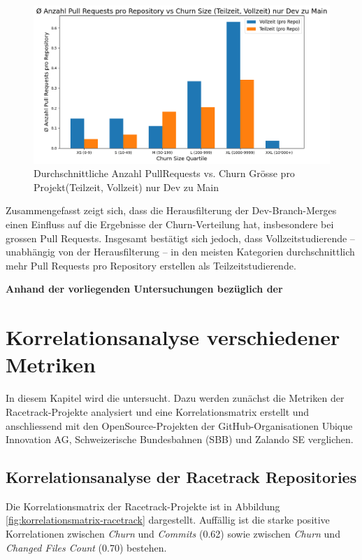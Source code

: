 \begin{figure}[htbp]
    \includegraphics[width=\textwidth]{Figures/avg-anz-prs-vs-churn-size-tz-vz-pro-repo-nur-dev.png}
    \caption{Durchschnittliche Anzahl PullRequests vs. Churn Grösse pro Projekt(Teilzeit, Vollzeit) nur Dev zu Main}
    \label{fig:anz-prs-vs-churn-size-tz-vz-nur-dev}
\end{figure}

Zusammengefasst zeigt sich, dass die Herausfilterung der Dev-Branch-Merges einen Einfluss auf die Ergebnisse der Churn-Verteilung hat, insbesondere bei grossen Pull Requests. Insgesamt bestätigt sich jedoch, dass Vollzeitstudierende – unabhängig von der Herausfilterung – in den meisten Kategorien durchschnittlich mehr Pull Requests pro Repository erstellen als Teilzeitstudierende.

\textbf{Anhand der vorliegenden Untersuchungen bezüglich der  }

\section{Korrelationsanalyse verschiedener Metriken}
In diesem Kapitel wird die  untersucht. Dazu werden zunächst die Metriken der Racetrack-Projekte analysiert und eine Korrelationsmatrix erstellt und anschliessend mit den OpenSource-Projekten der GitHub-Organisationen Ubique Innovation AG, Schweizerische Bundesbahnen (SBB) und Zalando SE verglichen.
\subsection{Korrelationsanalyse der Racetrack Repositories}
Die Korrelationsmatrix der Racetrack-Projekte ist in Abbildung \autoref{fig:korrelationsmatrix-racetrack} dargestellt. Auffällig ist die starke positive Korrelationen zwischen \textit{Churn} und \textit{Commits} (0.62) sowie zwischen \textit{Churn} und \textit{Changed Files Count} (0.70) bestehen. 

